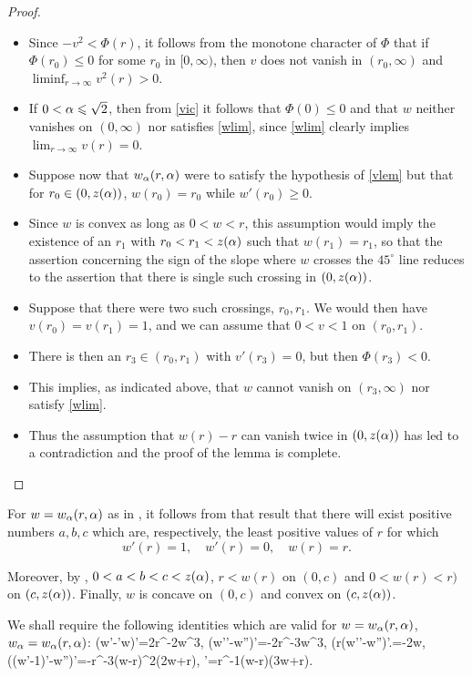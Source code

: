 \begin{proof}
\begin{itemize}
    \item Since $-v^2<\Phi(r)$, it follows from the monotone character of $\Phi$
        that if $\Phi(r_0)\leq 0$ for some $r_0$ in $[0,\infty)$, then $v$ does
        not vanish in $(r_0,\infty)$ and $\liminf_{r\to\infty} v^2(r)>0$.
    \item If $0<\alpha\leqslant\sqrt{2}$, then from \eqref{vic} it follows that
        $\Phi(0)\leq 0$ and that $w$ neither vanishes on $(0,\infty)$ nor
        satisfies \eqref{wlim}, since \eqref{wlim} clearly implies
        $\lim_{r\to\infty}v(r)=0$.
    \item Suppose now that $w_\alpha(r,\alpha)$ were to satisfy the hypothesis of \cref{vlem}
        but that for $r_0\in(0,z(\alpha))$, $w(r_0)=r_0$ while $w'(r_0)\geq0$.
    \item Since $w$ is convex as long as $0<w<r$, this assumption would imply
        the existence of an $r_1$ with $r_0<r_1<z(\alpha)$ such that $w(r_1)=r_1$, so
        that the assertion concerning the sign of the slope where $w$ crosses
        the $45^\circ$ line reduces to the assertion that there is  single such
        crossing in $(0,z(\alpha))$.
    \item Suppose that there were two such crossings, $r_0,r_1$. We would then
        have $v(r_0)=v(r_1)=1$, and we can assume that $0<v<1$ on $(r_0,r_1)$.
    \item There is then an $r_3\in(r_0,r_1)$ with $v'(r_3)=0$, but then
        $\Phi(r_3)<0$.
    \item This implies, as indicated above, that $w$ cannot vanish on
        $(r_3,\infty)$ nor satisfy \eqref{wlim}.
    \item Thus the assumption that $w(r)-r$ can vanish twice in $(0,z(\alpha))$ has
        led to a contradiction and the proof of the lemma is complete.
\end{itemize}
\end{proof}

For $w=w_\alpha(r,\alpha)$ as in , it follows from that result that there will exist
positive numbers $a, b, c$ which are, respectively, the least positive values of
$r$ for which $$w'(r)=1,\quad w'(r)=0,\quad w(r)=r.$$

Moreover, by , $0<a<b<c<z(\alpha)$, $r<w(r)$ on $(0,c)$ and $0<w(r)<r)$ on
$(c,z(\alpha))$. Finally, $w$ is concave on $(0,c)$ and convex on $(c, z(\alpha))$.

We shall require the following identities which are valid for $w=w_\alpha(r,\alpha)$,
$w_\alpha=w_\alpha(r,\alpha)$:
\be\label{ids1}
(w'\was-\was'w)'=2r^{-2}w^3\was,
\ee
\be\label{ids2}
(w'\was'-w''\was)'=-2r^{-3}w^3\was,
\ee
\be\label{ids3}
\left(r(w'\was'-w''\was)'\right.=-2w\was,
\ee
\be\label{ids4}
\left((w'-1)\was'-w''\was\right)'=-r^{-3}\was(w-r)^2(2w+r),
\ee
\be\label{ids5}
'=r^{-1}\was(w-r)(3w+r).
\ee

